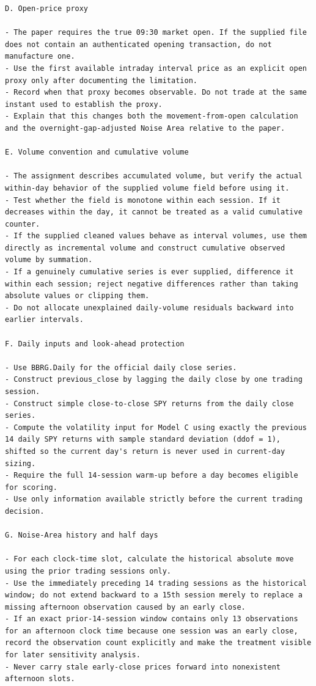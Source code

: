 \documentclass{article}
\begin{document}
\begin{lstlisting}
D. Open-price proxy

- The paper requires the true 09:30 market open. If the supplied file does not contain an authenticated opening transaction, do not manufacture one.
- Use the first available intraday interval price as an explicit open proxy only after documenting the limitation.
- Record when that proxy becomes observable. Do not trade at the same instant used to establish the proxy.
- Explain that this changes both the movement-from-open calculation and the overnight-gap-adjusted Noise Area relative to the paper.

E. Volume convention and cumulative volume

- The assignment describes accumulated volume, but verify the actual within-day behavior of the supplied volume field before using it.
- Test whether the field is monotone within each session. If it decreases within the day, it cannot be treated as a valid cumulative counter.
- If the supplied cleaned values behave as interval volumes, use them directly as incremental volume and construct cumulative observed volume by summation.
- If a genuinely cumulative series is ever supplied, difference it within each session; reject negative differences rather than taking absolute values or clipping them.
- Do not allocate unexplained daily-volume residuals backward into earlier intervals.

F. Daily inputs and look-ahead protection

- Use BBRG.Daily for the official daily close series.
- Construct previous_close by lagging the daily close by one trading session.
- Construct simple close-to-close SPY returns from the daily close series.
- Compute the volatility input for Model C using exactly the previous 14 daily SPY returns with sample standard deviation (ddof = 1), shifted so the current day's return is never used in current-day sizing.
- Require the full 14-session warm-up before a day becomes eligible for scoring.
- Use only information available strictly before the current trading decision.

G. Noise-Area history and half days

- For each clock-time slot, calculate the historical absolute move using the prior trading sessions only.
- Use the immediately preceding 14 trading sessions as the historical window; do not extend backward to a 15th session merely to replace a missing afternoon observation caused by an early close.
- If an exact prior-14-session window contains only 13 observations for an afternoon clock time because one session was an early close, record the observation count explicitly and make the treatment visible for later sensitivity analysis.
- Never carry stale early-close prices forward into nonexistent afternoon slots.


\end{lstlisting}
\end{document}

